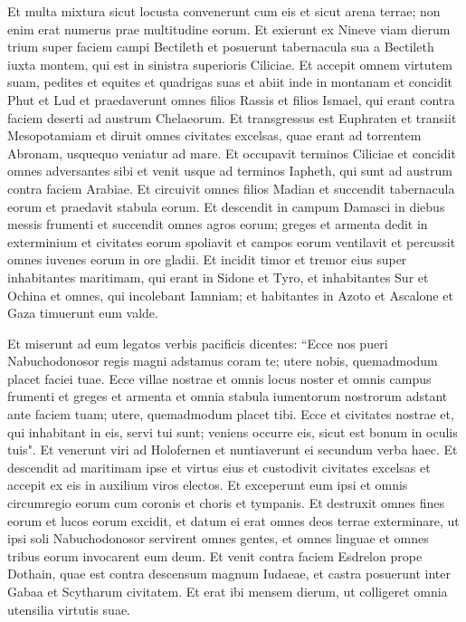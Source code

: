\begin{biblechapter}
\verse Et multa mixtura sicut locusta convenerunt cum eis et sicut arena terrae; non enim erat numerus prae multitudine eorum. 
\verse Et exierunt ex Nineve viam dierum trium super faciem campi Bectileth et posuerunt tabernacula sua a Bectileth iuxta montem, qui est in sinistra superioris Ciliciae. 
\verse Et accepit omnem virtutem suam, pedites et equites et quadrigas suas et abiit inde in montanam  
\verse et concidit Phut et Lud et praedaverunt omnes filios Rassis et filios Ismael, qui erant contra faciem deserti ad austrum Chelaeorum. 
\verse Et transgressus est Euphraten et transiit Mesopotamiam et diruit omnes civitates excelsas, quae erant ad torrentem Abronam, usquequo veniatur ad mare. 
\verse Et occupavit terminos Ciliciae et concidit omnes adversantes sibi et venit usque ad terminos Iapheth, qui sunt ad austrum contra faciem Arabiae. 
\verse Et circuivit omnes filios Madian et succendit tabernacula eorum et praedavit stabula eorum. 
\verse Et descendit in campum Damasci in diebus messis frumenti et succendit omnes agros eorum; greges et armenta dedit in exterminium et civitates eorum spoliavit et campos eorum ventilavit et percussit omnes iuvenes eorum in ore gladii.  
\verse Et incidit timor et tremor eius super inhabitantes maritimam, qui erant in Sidone et Tyro, et inhabitantes Sur et Ochina et omnes, qui incolebant Iamniam; et habitantes in Azoto et Ascalone et Gaza timuerunt eum valde. 
\end{biblechapter}

\begin{biblechapter}  
\verse Et miserunt ad eum legatos verbis pacificis dicentes: 
\verse “Ecce nos pueri Nabuchodonosor regis magni adstamus coram te; utere nobis, quemadmodum placet faciei tuae. 
\verse Ecce villae nostrae et omnis locus noster et omnis campus frumenti et greges et armenta et omnia stabula iumentorum nostrorum adstant ante faciem tuam; utere, quemadmodum placet tibi. 
\verse Ecce et civitates nostrae et, qui inhabitant in eis, servi tui sunt; veniens occurre eis, sicut est bonum in oculis tuis". 
\verse Et venerunt viri ad Holofernen et nuntiaverunt ei secundum verba haec. 
\verse Et descendit ad maritimam ipse et virtus eius et custodivit civitates excelsas et accepit ex eis in auxilium viros electos. 
\verse Et exceperunt eum ipsi et omnis circumregio eorum cum coronis et choris et tympanis. 
\verse Et destruxit omnes fines eorum et lucos eorum excidit, et datum ei erat omnes deos terrae exterminare, ut ipsi soli Nabuchodonosor servirent omnes gentes, et omnes linguae et omnes tribus eorum invocarent eum deum. 
\verse Et venit contra faciem Esdrelon prope Dothain, quae est contra descensum magnum Iudaeae, 
\verse et castra posuerunt inter Gabaa et Scytharum civitatem. Et erat ibi mensem dierum, ut colligeret omnia utensilia virtutis suae. 
\end{biblechapter}

